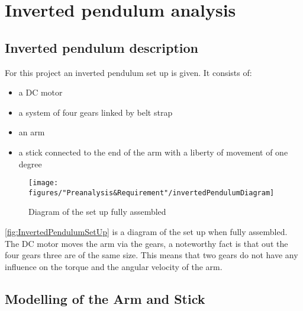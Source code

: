 \chapter{Inverted pendulum analysis}


\section{Inverted pendulum description}
For this project an inverted pendulum set up is given. It consists of:
\begin{itemize}
	\item a DC motor
	\item a system of four gears linked by belt strap
	\item an arm
	\item a stick connected to the end of the arm with a liberty of movement of one degree
\end{itemize}

\begin{figure} [htbp]
	\centering
	\texttt{[image: figures/"Preanalysis\&Requirement"/invertedPendulumDiagram]}
	\caption{Diagram of the set up fully assembled} \label{fig:InvertedPendulumSetUp}
\end{figure}

\autoref{fig:InvertedPendulumSetUp} is a diagram of the set up when fully assembled. The DC motor moves the arm via the gears, a noteworthy fact is that out the four gears three are of the same size. This means that two gears do not have any influence on the torque and the angular velocity of the arm.

\section{Modelling of the Arm and Stick}

